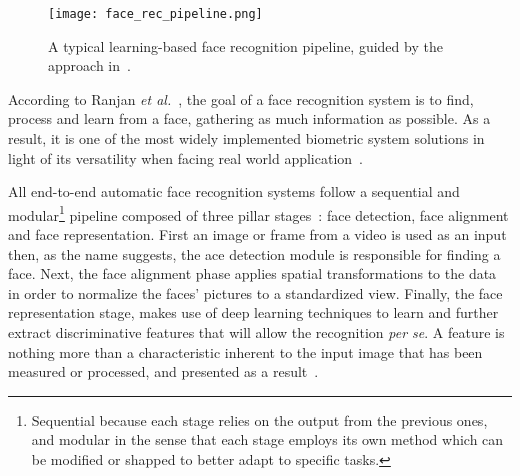 \documentclass[class=report, crop=false, a4paper, 12pt]{standalone}
\begin{document}
\begin{figure}[H]
    \centering
    \texttt{[image: face\_rec\_pipeline.png]}
    \caption{A typical learning-based face recognition pipeline, guided by the approach in~\autocite{wangDeepFaceRecognition2021}.}
    \label{fig:fr pipeline}
\end{figure}

\par According to Ranjan \textit{et al.}~\autocite{ranjanDeepLearningUnderstanding2018}, the goal of a face recognition system is to find, process and learn from a face, gathering as much information as possible. As a result, it is one of the most widely implemented biometric system solutions in light of its versatility when facing real world application~\autocite{duElementsEndtoendDeep2022}.

\par All end-to-end automatic face recognition systems follow a sequential and modular\footnote{Sequential because each stage relies on the output from the previous ones, and modular in the sense that each stage employs its own method which can be modified or shapped to better adapt to specific tasks.} pipeline  composed of three pillar stages~\autocite{wangDeepFaceRecognition2021}: face detection, face alignment and face representation. First an image or frame from a video is used as an input then, as the name suggests, the ace detection module is responsible for finding a face. Next, the face alignment phase applies spatial transformations to the data in order to normalize the faces' pictures to a standardized view. Finally, the face representation stage, makes use of deep learning techniques to learn and further extract discriminative features that will allow the recognition \textit{per se}. A feature is nothing more than a characteristic inherent to the input image that has been measured or processed, and presented as a result~\autocite{Goodfellow-et-al-2016}.
\end{document}
